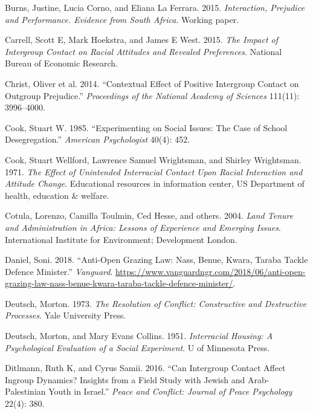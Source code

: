 \documentclass[11pt]{article}
\begin{document}
\leavevmode\hypertarget{ref-burns2015interaction}{}%
Burns, Justine, Lucia Corno, and Eliana La Ferrara. 2015.
\emph{Interaction, Prejudice and Performance. Evidence from South
Africa}. Working paper.

\leavevmode\hypertarget{ref-carrell2015impact}{}%
Carrell, Scott E, Mark Hoekstra, and James E West. 2015. \emph{The
Impact of Intergroup Contact on Racial Attitudes and Revealed
Preferences}. National Bureau of Economic Research.

\leavevmode\hypertarget{ref-christ2014contextual}{}%
Christ, Oliver et al. 2014. ``Contextual Effect of Positive Intergroup
Contact on Outgroup Prejudice.'' \emph{Proceedings of the National
Academy of Sciences} 111(11): 3996--4000.

\leavevmode\hypertarget{ref-cook1985experimenting}{}%
Cook, Stuart W. 1985. ``Experimenting on Social Issues: The Case of
School Desegregation.'' \emph{American Psychologist} 40(4): 452.

\leavevmode\hypertarget{ref-cook1971race}{}%
Cook, Stuart Wellford, Lawrence Samuel Wrightsman, and Shirley
Wrightsman. 1971. \emph{The Effect of Unintended Interracial Contact
Upon Racial Interaction and Attitude Change}. Educational resources in
information center, US Department of health, education \& welfare.

\leavevmode\hypertarget{ref-cotula2004land}{}%
Cotula, Lorenzo, Camilla Toulmin, Ced Hesse, and others. 2004.
\emph{Land Tenure and Administration in Africa: Lessons of Experience
and Emerging Issues}. International Institute for Environment;
Development London.

\leavevmode\hypertarget{ref-daniel2018anti}{}%
Daniel, Soni. 2018. ``Anti-Open Grazing Law: Nass, Benue, Kwara, Taraba
Tackle Defence Minister.'' \emph{Vanguard}.
\url{https://www.vanguardngr.com/2018/06/anti-open-grazing-law-nass-benue-kwara-taraba-tackle-defence-minister/}.

\leavevmode\hypertarget{ref-deutsch1973resolution}{}%
Deutsch, Morton. 1973. \emph{The Resolution of Conflict: Constructive
and Destructive Processes}. Yale University Press.

\leavevmode\hypertarget{ref-deutsch1951interracial}{}%
Deutsch, Morton, and Mary Evans Collins. 1951. \emph{Interracial
Housing: A Psychological Evaluation of a Social Experiment}. U of
Minnesota Press.

\leavevmode\hypertarget{ref-ditlmann2016can}{}%
Ditlmann, Ruth K, and Cyrus Samii. 2016. ``Can Intergroup Contact Affect
Ingroup Dynamics? Insights from a Field Study with Jewish and
Arab-Palestinian Youth in Israel.'' \emph{Peace and Conflict: Journal of
Peace Psychology} 22(4): 380.
\end{document}
